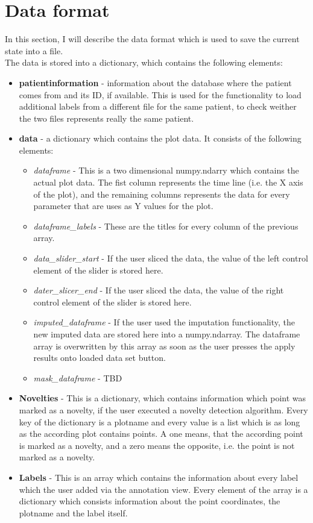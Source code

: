 
\chapter{Data format}
In this section, I will describe the data format which is used to save the current state into a file. 
\\The data is stored into a dictionary, which contains the following elements:
\begin{itemize}
\item \textbf{patientinformation} - information about the database where the patient comes from and its ID, if available. This is used for the functionality to load additional labels from a different file for the same patient, to check weither the two files represents really the same patient. 
\item \textbf{data} - a dictionary which contains the plot data. It consists of the following elements:
\begin{itemize}
\item \textit{dataframe} - This is a two dimensional numpy.ndarry which contains the actual plot data. The fist column represents the time line (i.e. the X axis of the plot), and the remaining columns represents the data for every parameter that are uses as Y values for the plot.
\item \textit{dataframe\_labels} - These are the titles for every column of the previous array. 
\item \textit{data\_slider\_start} - If the user sliced the data, the value of the left control element of the slider is stored here.
\item \textit{dater\_slicer\_end} - If the user sliced the data, the value of the right control element of the slider is stored here.
\item \textit{imputed\_dataframe} - If the user used the imputation functionality, the new imputed data are stored here into a numpy.ndarray. The dataframe array is overwritten by this array as soon as the user presses the \glqq apply results onto loaded data set\grqq{} button.
\item \textit{mask\_dataframe} - TBD
\end{itemize}
\item \textbf{Novelties} - This is a dictionary, which contains information which point was marked as a novelty, if the user executed a novelty detection algorithm. Every key of the dictionary is a plotname and every value is a list which is as long as the according plot contains points. A one means, that the according point is marked as a novelty, and a zero means the opposite, i.e. the point is not marked as a novelty.
\item \textbf{Labels} - This is an array which contains the information about every label which the user added via the annotation view. Every element of the array is a dictionary which consists information about the point coordinates, the plotname and the label itself.  
\end{itemize}

